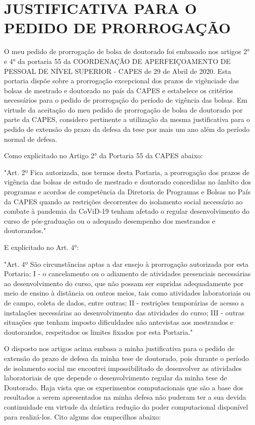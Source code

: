 \chapter{JUSTIFICATIVA PARA O PEDIDO DE PRORROGAÇÃO}
\label{justificativa}

O meu pedido de prorrogação de bolsa de doutorado foi embasado nos artigos 2° e 4° da portaria 55
da COORDENAÇÃO DE APERFEIÇOAMENTO DE PESSOAL DE NÍVEL SUPERIOR - CAPES de 29 de Abril de 2020.
Esta portaria dispõe sobre a prorrogação excepcional
dos prazos de vigênciade das bolsas de mestrado e doutorado no país da CAPES
e estabelece os critérios necessários para o pedido de prorrogação do período de vigência das bolsas.
Em virtude da aceitação do meu pedido de prorrogação de bolsa de doutorado por parte da CAPES,
considero pertinente a utilização da mesma justificativa para o pedido de extensão do prazo da defesa da tese
por mais um ano além do período normal de defesa.

Como explicitado no Artigo 2° da Portaria 55 da CAPES abaixo:

"Art. 2º Fica autorizada, nos termos desta Portaria, a prorrogação dos prazos de vigência das bolsas de estudo de mestrado e doutorado concedidas no âmbito dos programas e acordos de competência da Diretoria de Programas e Bolsas no País da CAPES quando as restrições decorrentes do isolamento social necessário ao combate à pandemia da CoViD-19 tenham afetado o regular desenvolvimento do curso de pós-graduação ou o adequado desempenho dos mestrandos e doutorandos."

E explicitado no Art. 4°:

"Art. 4º São circunstâncias aptas a dar ensejo à prorrogação autorizada por esta Portaria:
I - o cancelamento ou o adiamento de atividades presenciais necessárias ao desenvolvimento do curso, que não possam ser supridas adequadamente por meio de ensino à distância ou outros meios, tais como atividades laboratoriais ou de campo, coleta de dados, entre outras; II - restrições temporárias de acesso a instalações necessárias ao desenvolvimento das atividades do curso;
III - outras situações que tenham imposto dificuldades não antevistas aos mestrandos e doutorandos, respeitados os limites fixados por esta Portaria."

O disposto nos artigos acima embasa a minha justificativa para o pedido de extensão do prazo de defesa da minha
tese de doutorado, pois durante o período de isolamento social me encontrei impossibilitado de desenvolver as atividades laboratoriais de que depende o desenvolvimento regular da minha tese de Doutorado. Haja vista que os experimentos computacionais que são a base dos resultados a serem apresentados na minha defesa não puderam ter a sua devida continuidade em virtude da drástica redução do poder computacional disponível para realizá-los. Cito alguns dos empecilhos abaixo:

